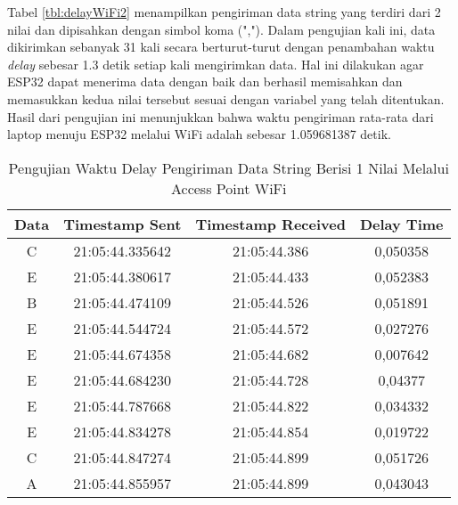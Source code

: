 Tabel \ref{tbl:delayWiFi2} menampilkan pengiriman data string yang terdiri dari 2 nilai dan dipisahkan dengan simbol koma (","). Dalam pengujian kali ini, data dikirimkan sebanyak 31 kali secara berturut-turut dengan penambahan waktu \emph{delay} sebesar 1.3 detik setiap kali mengirimkan data. Hal ini dilakukan agar ESP32 dapat menerima data dengan baik dan berhasil memisahkan dan memasukkan kedua nilai tersebut sesuai dengan variabel yang telah ditentukan. Hasil dari pengujian ini menunjukkan bahwa waktu pengiriman rata-rata dari laptop menuju ESP32 melalui WiFi adalah sebesar 1.059681387 detik.

\begin{table}[!h]
  \caption{Pengujian Waktu Delay Pengiriman Data String Berisi 1 Nilai Melalui Access Point WiFi}
  \label{tbl:delayWiFi1}
  \begin{tabular}{|ccc|c|}
  \hline
  \multicolumn{1}{|c|}{Data} & \multicolumn{1}{c|}{Timestamp Sent}  & Timestamp Received & Delay Time    \\ \hline
  \multicolumn{1}{|c|}{C}    & \multicolumn{1}{c|}{21:05:44.335642} & 21:05:44.386       & 0,050358      \\ \hline
  \multicolumn{1}{|c|}{E}    & \multicolumn{1}{c|}{21:05:44.380617} & 21:05:44.433       & 0,052383      \\ \hline
  \multicolumn{1}{|c|}{B}    & \multicolumn{1}{c|}{21:05:44.474109} & 21:05:44.526       & 0,051891      \\ \hline
  \multicolumn{1}{|c|}{E}    & \multicolumn{1}{c|}{21:05:44.544724} & 21:05:44.572       & 0,027276      \\ \hline
  \multicolumn{1}{|c|}{E}    & \multicolumn{1}{c|}{21:05:44.674358} & 21:05:44.682       & 0,007642      \\ \hline
  \multicolumn{1}{|c|}{E}    & \multicolumn{1}{c|}{21:05:44.684230} & 21:05:44.728       & 0,04377       \\ \hline
  \multicolumn{1}{|c|}{E}    & \multicolumn{1}{c|}{21:05:44.787668} & 21:05:44.822       & 0,034332      \\ \hline
  \multicolumn{1}{|c|}{E}    & \multicolumn{1}{c|}{21:05:44.834278} & 21:05:44.854       & 0,019722      \\ \hline
  \multicolumn{1}{|c|}{C}    & \multicolumn{1}{c|}{21:05:44.847274} & 21:05:44.899       & 0,051726      \\ \hline
  \multicolumn{1}{|c|}{A}    & \multicolumn{1}{c|}{21:05:44.855957} & 21:05:44.899       & 0,043043      \\ \hline

\end{tabular}
\end{table}
